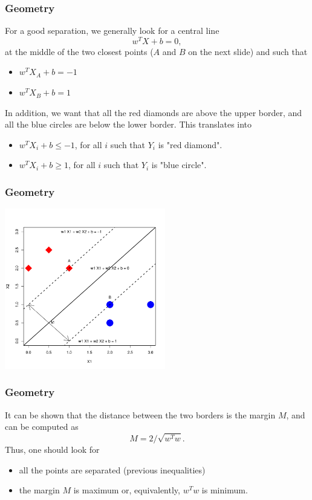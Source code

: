 \begin{frame}
\frametitle{Geometry}
For a good separation, we generally look for a central line 
$$
w^TX + b = 0,
$$ 
at the middle of the two closest points ($A$ and $B$ on the next slide) and such that 
\begin{itemize}
\item $w^T X_A + b = -1$
\item $w^T X_B + b = 1$
\end{itemize}
In addition, we want that all the red diamonds are above the upper border, and all the blue circles are below the lower border. This translates into
\begin{itemize}
\item $w^T X_i + b \leq -1$, for all $i$ such that $Y_i$ is "red diamond".
\item $w^T X_i + b \geq 1$, for all $i$ such that $Y_i$ is "blue circle".
\end{itemize}
\end{frame}
\begin{frame}
\frametitle{Geometry}
\begin{center}
\includegraphics[width=7cm]{../../Graphs/SVM_Borders_5.pdf}
\end{center}
\end{frame}
\begin{frame}
\frametitle{Geometry}
It can be shown that the distance between the two borders is the margin $M$, and can be computed as 
$$
M=2/\sqrt{w^T w}.
$$
Thus, one should look for 
\begin{itemize}
\item all the points are separated (previous inequalities) 
\item the margin $M$ is maximum or, equivalently, $w^Tw$ is minimum.
\end{itemize}
\end{frame}
